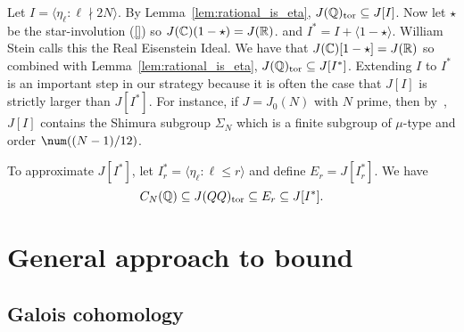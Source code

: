 Let $I= \langle \eta_\ell:\ell\nmid 2N \rangle$. By
Lemma~\ref{lem:rational_is_eta}, $J(\mathbb{Q})_{\mathrm{tor}}\subseteq J[I]$. Now let $\star$
be the star-involution (\ref{}) so $J(\mathbb{C})(1-\star)=J(\mathbb{R})$. and $I^*=I +
\langle 1-\star \rangle$. William Stein calls this the Real Eisenstein Ideal.
We have that $J(\mathbb{C})[1-\star]=J(\mathbb{R})$ so combined with
Lemma~\ref{lem:rational_is_eta}, $J(\mathbb{Q})_{\mathrm{tor}}\subseteq J[I^*]$. Extending $I$
to $I^*$ is an important step in our strategy because it is often the case that
$J[I]$ is strictly larger than $J[I^*]$. For instance, if $J=J_0(N)$ with $N$
prime, then by~\cite[Cor. 16.3]{mazur:eisenstein}, $J[I]$ contains the Shimura
subgroup $\Sigma_N$ which is a finite subgroup of $\mu$-type and order
$\num((N-1)/12)$.

To approximate $J[I^*]$, let $I_r ^* = \langle \eta_\ell:\ell\leq r \rangle$
and define $E_r = J[I_r ^*]$.
We have
\begin{equation}%
    \label{eq:eta_equation}
    C_N(\QQ)\subseteq J(QQ)_\tor \subseteq E_r \subseteq J[I^*].
\end{equation}

\section{General approach to bound}%
\label{sec:galois_cohomology_bounds}

\subsection{Galois cohomology}%
\label{sub:galois_cohomology}

